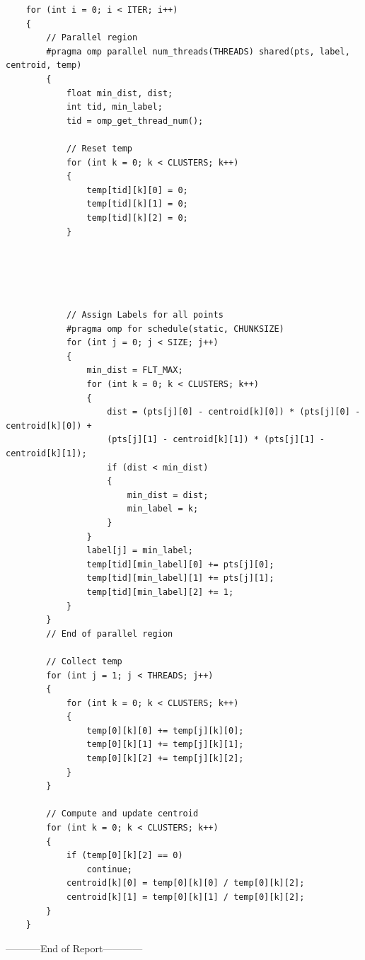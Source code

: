 \documentclass[11pt,a4paper,oneside]{article}
\begin{document}
    \begin{Verbatim}
    for (int i = 0; i < ITER; i++)
    {	
    	// Parallel region
    	#pragma omp parallel num_threads(THREADS) shared(pts, label, centroid, temp)
    	{	
    		float min_dist, dist;
		    int tid, min_label;
		    tid = omp_get_thread_num();
    
		    // Reset temp
		    for (int k = 0; k < CLUSTERS; k++)
		    {
			    temp[tid][k][0] = 0;
			    temp[tid][k][1] = 0;
			    temp[tid][k][2] = 0;
		    }
		    
		    
		    
		    
    
		    // Assign Labels for all points
		    #pragma omp for schedule(static, CHUNKSIZE)
		    for (int j = 0; j < SIZE; j++)
		    {
			    min_dist = FLT_MAX;                
			    for (int k = 0; k < CLUSTERS; k++)
			    {
				    dist = (pts[j][0] - centroid[k][0]) * (pts[j][0] - centroid[k][0]) +
				    (pts[j][1] - centroid[k][1]) * (pts[j][1] - centroid[k][1]);
				    if (dist < min_dist)
				    {
					    min_dist = dist;
					    min_label = k;
			    	}
		    	}
			    label[j] = min_label;
			    temp[tid][min_label][0] += pts[j][0];
			    temp[tid][min_label][1] += pts[j][1];
			    temp[tid][min_label][2] += 1; 
    		}
    	}
	    // End of parallel region
	    
	    // Collect temp
	    for (int j = 1; j < THREADS; j++)
	    {
		    for (int k = 0; k < CLUSTERS; k++)
		    {
			    temp[0][k][0] += temp[j][k][0];
			    temp[0][k][1] += temp[j][k][1];
			    temp[0][k][2] += temp[j][k][2];
		    }
	    }
    
	    // Compute and update centroid
	    for (int k = 0; k < CLUSTERS; k++)
	    {
		    if (temp[0][k][2] == 0)
		    	continue;
		    centroid[k][0] = temp[0][k][0] / temp[0][k][2];
		    centroid[k][1] = temp[0][k][1] / temp[0][k][2];
	    }
    }
    \end{Verbatim}
    
    \begin{center}
    	-----------End of Report------------
    \end{center}
    
\end{document}

